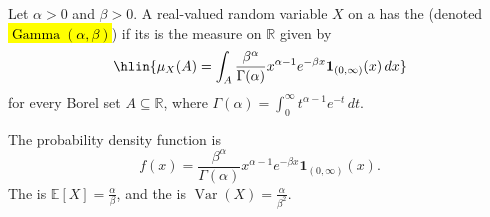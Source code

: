 \begin{definition} \label{definition:gamma_distribution}
Let $\alpha > 0$ and $\beta > 0$. A real-valued random variable $X$ on a  has the  (denoted \hl{$\operatorname{Gamma}(\alpha, \beta)$}) if its  is the measure on $\mathbb{R}$ given by
$$\hlin{\mu_X(A) = \int_A \frac{\beta^\alpha}{\Gamma(\alpha)} x^{\alpha - 1} e^{-\beta x} \mathbf{1}_{(0, \infty)}(x) \, dx}$$
for every Borel set $A \subseteq \mathbb{R}$, where $\Gamma(\alpha) = \int_0^\infty t^{\alpha - 1} e^{-t} \, dt$.

The probability density function is $$f(x) = \frac{\beta^\alpha}{\Gamma(\alpha)} x^{\alpha - 1} e^{-\beta x} \mathbf{1}_{(0, \infty)}(x).$$ The  is $\mathbb{E}[X] = \tfrac{\alpha}{\beta}$, and the  is $\operatorname{Var}(X) = \tfrac{\alpha}{\beta^2}$.
\end{definition}